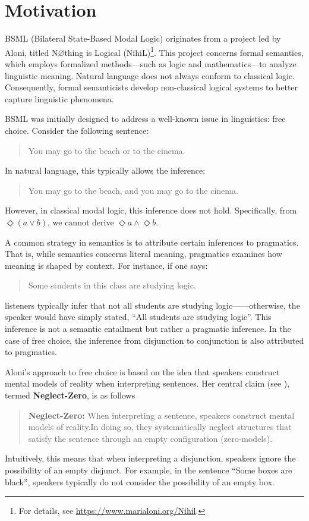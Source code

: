 \section{Motivation}\label{Motivation}

BSML (Bilateral State-Based Modal Logic) originates from a project led by Aloni, 
titled N$\varnothing$thing is Logical (NihiL)\footnote{For details, see \url{https://www.marialoni.org/Nihil}.}. 
This project concerns formal semantics, which employs formalized methods—such as logic and mathematics—to analyze linguistic meaning. 
Natural language does not always conform to classical logic. Consequently, formal semanticists develop non-classical logical systems to better capture linguistic phenomena.

BSML was initially designed to address a well-known issue in linguistics: free choice. Consider the following sentence:

\begin{quote}
    You may go to the beach or to the cinema.
\end{quote}

In natural language, this typically allows the inference:

\begin{quote}
    You may go to the beach, and you may go to the cinema.
\end{quote}

However, in classical modal logic, this inference does not hold. Specifically, from $\Diamond (a \vee b)$, we cannot derive $\Diamond a \land \Diamond b$.

A common strategy in semantics is to attribute certain inferences to pragmatics. 
That is, while semantics concerns literal meaning, pragmatics examines how meaning is shaped by context. For instance, if one says:

\begin{quote}
    Some students in this class are studying logic.
\end{quote}

listeners typically infer that not all students are studying logic——otherwise, the speaker would have simply stated, ``All students are studying logic''.
This inference is not a semantic entailment but rather a pragmatic inference.
In the case of free choice, the inference from disjunction to conjunction is also attributed to pragmatics.

Aloni's approach to free choice is based on the idea that speakers construct mental models of reality when interpreting sentences. Her central claim (see \citet{Aloni2022}), termed \textbf{Neglect-Zero}, is as follows
\begin{quote}
    \textbf{Neglect-Zero:} 
     When interpreting a sentence, speakers construct mental models of reality.In doing so, they systematically neglect structures that satisfy the sentence through an empty configuration (zero-models).
    
\end{quote}
Intuitively, this means that when interpreting a disjunction, speakers ignore the possibility of an empty disjunct. For example, in the sentence ``Some boxes are black'', speakers typically do not consider the possibility of an empty box.


